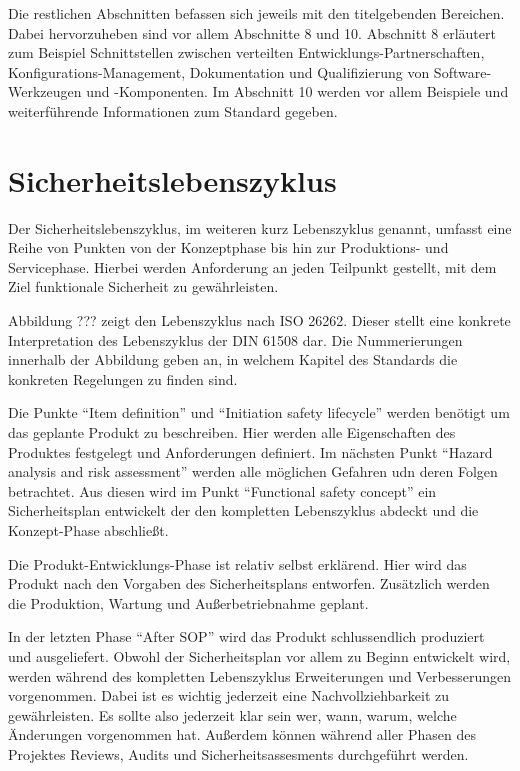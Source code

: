 \documentclass[a4paper,DIV=calc,ngerman]{scrartcl}
\begin{document}
Die restlichen Abschnitten befassen sich jeweils mit den titelgebenden Bereichen. Dabei hervorzuheben sind vor allem Abschnitte 8 und 10. Abschnitt 8 erläutert zum Beispiel Schnittstellen zwischen verteilten Entwicklungs-Partnerschaften, Konfigurations-Management, Dokumentation und Qualifizierung von Software-Werkzeugen und -Komponenten. Im Abschnitt 10 werden vor allem Beispiele und weiterführende Informationen zum Standard gegeben.


\section{Sicherheitslebenszyklus}
\label{sec:Sicherheitslebenszyklus}
Der Sicherheitslebenszyklus, im weiteren kurz Lebenszyklus genannt, umfasst eine Reihe von Punkten von der Konzeptphase bis hin zur Produktions- und Servicephase. Hierbei werden Anforderung an jeden Teilpunkt gestellt, mit dem Ziel funktionale Sicherheit zu gewährleisten.


Abbildung ??? zeigt den Lebenszyklus nach ISO 26262. Dieser stellt eine konkrete Interpretation des Lebenszyklus der DIN 61508 dar. Die Nummerierungen innerhalb der Abbildung geben an, in welchem Kapitel des Standards die konkreten Regelungen zu finden sind. 

Die Punkte "`Item definition"' und "`Initiation safety lifecycle"' werden benötigt um das geplante Produkt zu beschreiben. Hier werden alle Eigenschaften des Produktes festgelegt und Anforderungen definiert. Im nächsten Punkt "`Hazard analysis and risk assessment"' werden alle möglichen Gefahren udn deren Folgen betrachtet. Aus diesen wird im Punkt "`Functional safety concept"' ein Sicherheitsplan entwickelt der den kompletten Lebenszyklus abdeckt und die Konzept-Phase abschließt. 

Die Produkt-Entwicklungs-Phase ist relativ selbst erklärend. Hier wird das Produkt nach den Vorgaben des Sicherheitsplans entworfen. Zusätzlich werden die Produktion, Wartung und Außerbetriebnahme geplant.

In der letzten Phase "`After SOP"' wird das Produkt schlussendlich produziert und ausgeliefert. Obwohl der Sicherheitsplan vor allem zu Beginn entwickelt wird, werden während des kompletten Lebenszyklus Erweiterungen und Verbesserungen vorgenommen. Dabei ist es wichtig jederzeit eine Nachvollziehbarkeit zu gewährleisten. Es sollte also jederzeit klar sein wer, wann, warum, welche Änderungen vorgenommen hat. Außerdem können während aller Phasen des Projektes Reviews, Audits und Sicherheitsassesments durchgeführt werden. \cite[S. 121]{1}
\end{document}
